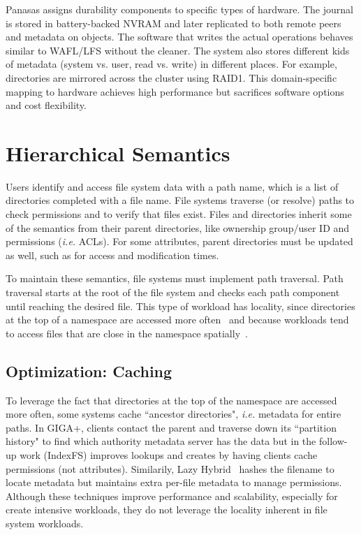 Panasas assigns durability components to specific types of hardware. The
journal is stored in battery-backed NVRAM and later replicated to both remote
peers and metadata on objects. The software that writes the actual operations
behaves similar to WAFL/LFS without the cleaner. The system also stores
different kids of metadata (system vs. user, read vs. write) in different
places. For example, directories are mirrored across the cluster using RAID1.
This domain-specific mapping to hardware achieves high performance but
sacrifices software options and cost flexibility.

\section{Hierarchical Semantics}

Users identify and access file system data with a path name, which is a list of
directories completed with a file name.  File systems traverse (or resolve)
paths to check permissions and to verify that files exist. Files and
directories inherit some of the semantics from their parent directories, like
ownership group/user ID and permissions ({\it i.e.} ACLs). For some attributes,
parent directories must be updated as well, such as for access and modification
times. 

To maintain these semantics, file systems must implement path traversal. Path
traversal starts at the root of the file system and checks each path component
until reaching the desired file. This type of workload has locality, since
directories at the top of a namespace are accessed more often~\cite{indexfs}
and because workloads tend to access files that are close in the namespace
spatially~\cite{weilthesis}.

\subsection{Optimization: Caching}

To leverage the fact that directories at the top of the namespace are accessed
more often, some systems cache ``ancestor directories", {\it i.e.} metadata for
entire paths. In GIGA+, clients contact the parent and traverse down its
``partition history" to find which authority metadata server has the data but
in the follow-up work (IndexFS) improves lookups and creates by having clients
cache permissions (not attributes).  Similarily, Lazy
Hybrid~\cite{brandt:mss2003-lh} hashes the filename to locate metadata but
maintains extra per-file metadata to manage permissions.  Although these
techniques improve performance and scalability, especially for create intensive
workloads, they do not leverage the locality inherent in file system workloads.

